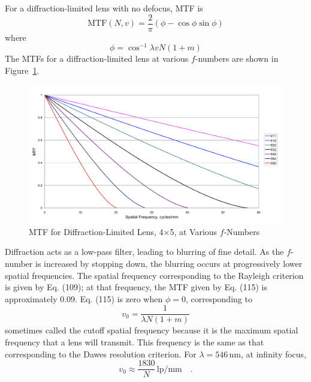 \documentclass[11pt, oneside]{scrartcl}   	%
\begin{document}
For a diffraction-limited lens with no defocus, 
MTF is 
\begin{equation}
   \mathrm{MTF}(N,v) = \frac2\pi(\phi - \cos\phi\sin\phi)
   \label{eq:MTF2}
\end{equation}
where
\begin{equation}
\phi = \cos^{-1}\lambda vN(1+m)
\end{equation}
The MTFs for a diffraction-limited lens at various $f$-numbers are shown in Figure~\ref{fig:MTF}.
\begin{figure}[htbp] %
   \centering
   \includegraphics[width=\linewidth]{figure/fig_dofd_6} 
   \caption{MTF for Diffraction-Limited Lens, 4×5, at Various $f$-Numbers}
   \label{fig:MTF}
\end{figure}
Diffraction acts as a low-pass filter, leading to blurring of fine detail. As the $f$-number is increased by stopping down, the blurring occurs at progressively lower spatial frequencies. The spatial frequency corresponding to the Rayleigh criterion is given by Eq. (109); at that frequency, the MTF given by Eq. (115) is approximately 0.09. Eq. (115) is zero when $\phi = 0$, corresponding to
\begin{equation}
   v_0 = \frac1{\lambda N(1+m)}
   \label{eq:v0}
\end{equation}
sometimes called the cutoff spatial frequency because it is the maximum spatial frequency that a lens will transmit. This frequency is the same as that corresponding to the Dawes resolution criterion. For $λ = 546$\,nm, at infinity focus,
\begin{equation}
   v_0 \approx \frac{1830}N\,\mathrm{lp/mm}\quad.
   \label{eq:v0num}
\end{equation}                                
\end{document}
